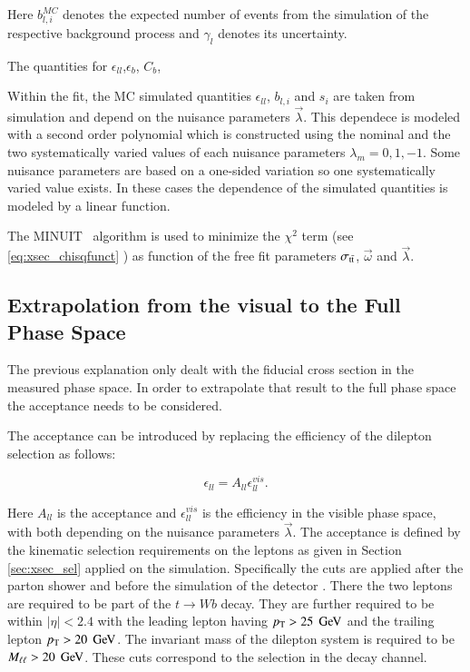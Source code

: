 Here $b_{l,i}^{MC}$ denotes the expected number of events from the simulation of the respective background process and $\gamma_l$ denotes its uncertainty.

The quantities for $\epsilon_{ll}$,$\epsilon_b$, $C_b$, 

Within the fit, the MC simulated quantities $\epsilon_{ll}$, $b_{l,i}$ and $s_{i}$ are taken from simulation and depend on the nuisance parameters $\vec{\lambda}$.
This dependece is modeled with a second order polynomial which is constructed using the nominal and the two systematically varied values of each nuisance parameters $\lambda_m=0,1,-1$.
Some nuisance parameters are based on a one-sided variation so one systematically varied value exists. In these cases the dependence of the simulated quantities is modeled by a linear function.

The MINUIT~\cite{James:1975dr} algorithm is used to minimize the  $\chi^2$ term (see \ref{eq:xsec_chisqfunct} ) as function of the free fit parameters $\sigma_\mathrm{t\bar{t}}$, $\vec{\omega}$
and $\vec{\lambda}$. 



\subsection{Extrapolation from the visual to the Full Phase Space}
\label{sec:xsec_extraction}

The previous explanation only dealt with the fiducial cross section in the measured phase space. In order to extrapolate that result to the full phase space the acceptance
needs to be considered.

The acceptance can be introduced by replacing the efficiency of the dilepton selection as follows:

\begin{equation}
\epsilon_{ll} = A_{ll} \epsilon^{vis}_{ll}.
\label{eq:epsacc}
\end{equation}

Here $A_{ll}$ is the acceptance and $\epsilon^{vis}_{ll}$ is the efficiency in the visible phase space, with both depending on the nuisance parameters $\vec{\lambda}$.
The acceptance is defined by the kinematic selection requirements on the leptons as given in Section \ref{sec:xsec_sel} applied on the simulation. Specifically the cuts are applied after the parton shower and before the simulation of the detector . There the two leptons are required to be part of the $t \rightarrow W b$ decay. They are further required to be within $|\eta|< 2.4$ with the 
leading lepton having $p_{\mathrm{T}} > 25 \; \,\text{Ge\hspace{-.08em}V}$ and the trailing lepton $p_{\mathrm{T}} > 20 \; \,\text{Ge\hspace{-.08em}V}$. The invariant mass of the dilepton system is required to be $M_{\ell\ell} > 20 \; \,\text{Ge\hspace{-.08em}V}$.
These cuts correspond to the selection in the \emu decay channel.

